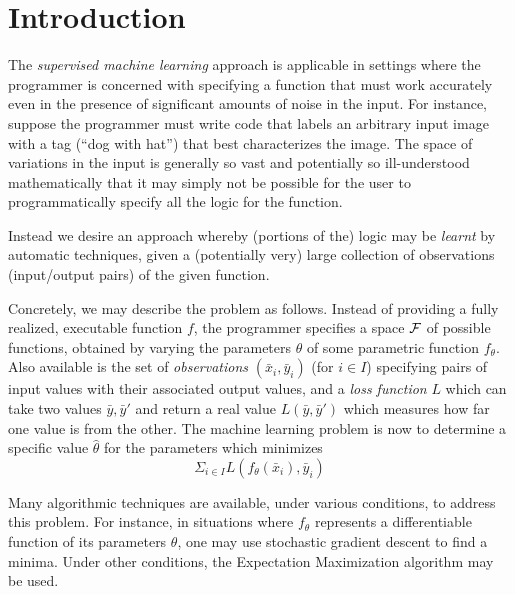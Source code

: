 \documentclass{article} %
\begin{document}
\def\Or{\vee}
\def\And{\wedge}
\def\Arrow{\rightarrow}
\def\Xor{\;\mbox{xor}\;}
\def\Ind{\;\mbox{Ind}}

\section{Introduction}
The {\em supervised machine learning} approach is applicable in
settings where the programmer is concerned with specifying a function
that must work accurately even in the presence of significant amounts
of noise in the input. For instance, suppose the programmer must write
code that labels an arbitrary input image with a tag (``dog with
hat'') that best characterizes the image. The space of variations in
the input is generally so vast and potentially so ill-understood
mathematically that it may simply not be possible for the user to
programmatically specify all the logic for the function.

Instead we desire an approach whereby (portions of the) logic may be
{\em learnt} by automatic techniques, given a (potentially very) large
collection of observations (input/output pairs) of the given
function. 

Concretely, we may describe the problem as follows. Instead of
providing a fully realized, executable function $f$, the programmer
specifies a space $\cal F$ of possible 
functions, obtained by varying the parameters $\theta$ of
some parametric function $f_{\theta}$.  Also
available is the set of {\em observations}
$(\bar{x}_i, \bar{y}_i)$ (for $i\in I$) specifying pairs of input values with their
associated output values, and a {\em loss function} $L$ which can take
two values $\bar{y},\bar{y}'$ and return a real value 
$L(\bar{y},\bar{y}')$ which measures how far one value is from the
other. The machine learning problem is now to determine a specific
value $\hat{\theta}$ for the parameters which minimizes
$$\Sigma_{i \in I} L(f_\theta(\bar{x}_i), \bar{y}_i)$$

Many algorithmic techniques are available, under various conditions,
to address this problem. For instance, in situations
where $f_{\theta}$ represents a differentiable function of its
parameters $\theta$, one may use stochastic gradient descent to find a
minima. Under other conditions, the Expectation Maximization algorithm
may be used.
\end{document}
